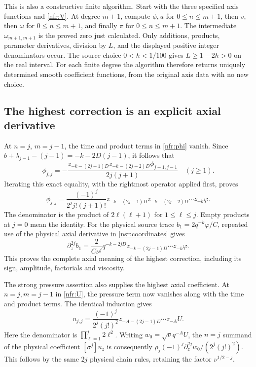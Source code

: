 This is also a constructive finite algorithm. Start with the three
specified axis functions and \eqref{nfr:V}. At degree \(m+1\), compute
\(\phi,u\) for \(0\leq n\leq m+1\), then \(v\), then
\(\omega\) for \(0\leq n\leq m+1\), and finally \(\pi\)
for \(0\leq n\leq m+1\). The intermediate
\(\omega_{m+1,m+1}\) is the proved zero just calculated.
Only additions, products, parameter
derivatives, division by \(L\), and the displayed positive integer
denominators occur. The source choice \(0<h<1/100\) gives
\(L\geq1-2h>0\) on the real interval. For each finite degree the
algorithm therefore returns uniquely determined smooth coefficient
functions, from the original axis data with no new choice.

\subsection{The highest correction is an explicit axial derivative}

At \(n=j\), \(m=j-1\), the time and product terms in
\eqref{nfr:phi} vanish. Since
\(b+\lambda_{j-1}-(j-1)=-k-2D(j-1)\), it follows that
\begin{equation}\label{nfr:diagonal-step}
 \phi_{j,j}=-\frac{
 z_{-k-(2j-1)D}z_{-k-(2j-2)D}\phi_{j-1,j-1}}
 {2j(j+1)}\quad(j\geq1).
\end{equation}
Iterating this exact equality, with the rightmost operator applied first,
proves
\begin{equation}\label{nfr:diagonal}
 \phi_{j,j}=\frac{(-1)^j}{2^j j!(j+1)!}
 z_{-k-(2j-1)D}z_{-k-(2j-2)D}\cdots z_{-k}\varphi .
\end{equation}
The denominator is the product of \(2\ell(\ell+1)\) for
\(1\leq\ell\leq j\). Empty products at \(j=0\) mean the identity.
For the physical source trace \(b_1=2q^{-k}\varphi/C\), repeated
use of the physical axial derivative in \eqref{nsr:coordinates} gives
\[
 \partial_z^{2j}b_1=\frac2{C\nu^j}q^{-k-2jD}
 z_{-k-(2j-1)D}\cdots z_{-k}\varphi.
\]
This proves the complete axial meaning of the highest correction,
including its sign, amplitude, factorials and viscosity.

The strong pressure assertion also supplies the highest axial coefficient.
At \(n=j,m=j-1\) in \eqref{nfr:U}, the pressure term now vanishes
along with the time and product terms. The identical induction gives
\begin{equation}\label{nfr:axial-diagonal}
 u_{j,j}=\frac{(-1)^j}{2^j(j!)^2}
 z_{-A-(2j-1)D}\cdots z_{-A}U .
\end{equation}
Here the denominator is \(\prod_{\ell=1}^j2\ell^2\).
Writing \(w_0=\sqrt\nu q^{-A}U\), the \(n=j\) summand of
the physical coefficient \([\sigma^j]u_z\) is consequently
\(\rho_j(-1)^j\partial_z^{2j}w_0/(2^j(j!)^2)\).
This follows by the same \(2j\) physical chain rules, retaining
the factor \(\nu^{1/2-j}\).

